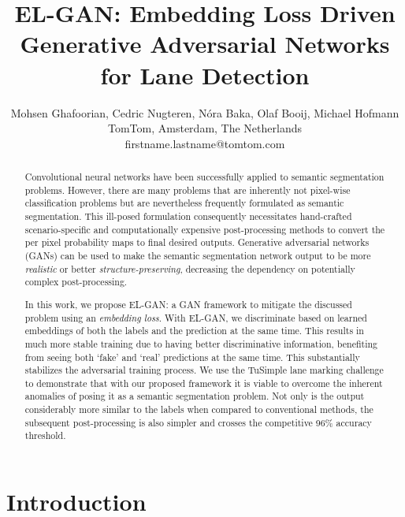 \documentclass{article} \usepackage{nips13submit_e,times}
\title{EL-GAN: Embedding Loss Driven Generative Adversarial Networks for Lane Detection}
\author{
Mohsen Ghafoorian, Cedric Nugteren, N\'ora Baka, Olaf Booij, Michael Hofmann \\
TomTom, Amsterdam, The Netherlands \\
{firstname.lastname}@tomtom.com \\
}
\newcommand{\elgan}{\mbox{EL-GAN}}
\begin{document}
\maketitle

\begin{abstract}

Convolutional neural networks have been successfully applied to semantic segmentation problems.
However, there are many problems that are inherently not pixel-wise classification problems but are nevertheless frequently formulated as semantic segmentation.
This ill-posed formulation consequently necessitates hand-crafted scenario-specific and computationally expensive post-processing methods to convert the per pixel probability maps to final desired outputs.
Generative adversarial networks (GANs) can be used to make the semantic segmentation network output to be more \emph{realistic} or better \emph{structure-preserving}, decreasing the dependency on potentially complex post-processing.

In this work, we propose \elgan{}: a GAN framework to mitigate the discussed problem using an \emph{embedding loss}.
With \elgan{}, we discriminate based on learned embeddings of both the labels and the prediction at the same time.
This results in much more stable training due to having better discriminative information, benefiting from seeing both `fake' and `real' predictions at the same time. This substantially stabilizes the adversarial training process.
We use the TuSimple lane marking challenge to demonstrate that with our proposed framework it is viable to overcome the inherent anomalies of posing it as a semantic segmentation problem.
Not only is the output considerably more similar to the labels when compared to conventional methods, the subsequent post-processing is also simpler and crosses the competitive 96\% accuracy threshold.


\end{abstract}

\section{Introduction}
\end{document}
